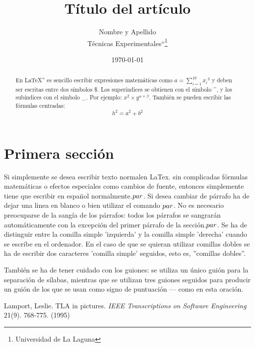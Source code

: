 \documentclass[a4paper,12pt]{article}
\begin{document}
\title{Título del artículo}
\author{Nombre y Apellido\\
    Técnicas Experimentales``\footnote{Universidad de La Laguna}
    }
\date{\today}
\maketitle
\begin{abstract}
 En \LaTeX{}''\cite{Lam:86} es sencillo escribir expresiones
 matemáticas como $a=\sum_{i=1}^{10} {x_i}^{3}$
 y deben ser escritas entre dos símbolos \$.
 Los superíndices se obtienen con el símbolo \^{}, y
 los subíndices con el símbolo \_.
 Por ejemplo: $x^2\times y^{\alpha + \beta}$.
 También se pueden escribir las fórmulas centradas:
 \[h^2=a^2 + b^2\]
\end{abstract}

\section{Primera sección}
Si simplemente se desea escribir texto normalen LaTex.
sin complicadas f\'ormulas matem\'aticas o efectos especiales
como cambios de fuente, entonces simplemente tiene que escribir
en espa\"nol normalmente.$\\par$.
Si desea cambiar de párrafo ha de dejar una linea en blanco o bien
utilizar el comando $\\par$.
No es necesario preocuparse de la sangía de los párrafos:
todos los párrafos se sangrarán automáticamente con la excepción 
del primer párrafo de la sección.$\\par$.
Se ha de distinguir entre la comilla simple 'izquierda'
y la comilla simple 'derecha' cuando se escribe en el ordenador.
En el caso de que se quieran utilizar comillas dobles se ha de
escribir dos caracteres 'comilla simple' seguidos, esto es,
''comillas dobles''.

También se ha de tener cuidado con los guiones: se utiliza un único
guión para la separación de sílabas, mientras que se utilizan
tres guiones seguidos para producir un guión de los que se usan
como signo de puntuación --- como en esta oración.

\begin{thebibliography}{00}
    Lamport, Leslie.
    TLA in pictures.
    \emph{IEEE Transcriptions on Software Engineering}
    21(9). 768-775.
    (1995)
    
\end{thebibliography}
\end{document}
